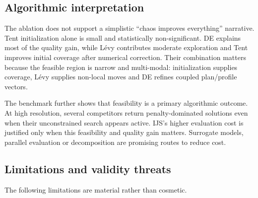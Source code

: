\documentclass[preprint,12pt]{elsarticle}
\begin{document}
\subsection{Algorithmic interpretation}

The ablation does not support a simplistic ``chaos improves everything'' narrative. Tent initialization alone is small and statistically non-significant. DE explains most of the quality gain, while L\'evy contributes moderate exploration and Tent improves initial coverage after numerical correction. Their combination matters because the feasible region is narrow and multi-modal: initialization supplies coverage, L\'evy supplies non-local moves and DE refines coupled plan/profile vectors.

The benchmark further shows that feasibility is a primary algorithmic outcome. At high resolution, several competitors return penalty-dominated solutions even when their unconstrained search appears active. IJS's higher evaluation cost is justified only when this feasibility and quality gain matters. Surrogate models, parallel evaluation or decomposition are promising routes to reduce cost.

\subsection{Limitations and validity threats}\label{sec:limitations}

The following limitations are material rather than cosmetic.
\end{document}
